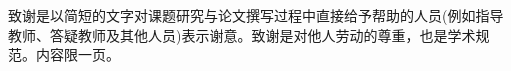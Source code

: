 \documentclass[type = master,class = academic]{whu-thesis}
\begin{document}
\tableofcontents %
\listoffigures %
\listoftables %


\mainmatter








\printbibliography

\appendix




\begin{acknowledgements}
  致谢是以简短的文字对课题研究与论文撰写过程中直接给予帮助的人员(例如指导教师、答疑教师及其他人员)表示谢意。致谢是对他人劳动的尊重，也是学术规范。内容限一页。
\end{acknowledgements}
\end{document}

